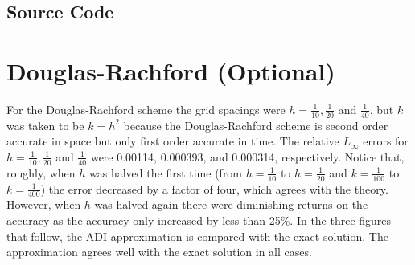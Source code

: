 \documentclass[a4paper,10pt]{article}
\begin{document}
	\subsection{Source Code}
	
	
	
	\section{Douglas-Rachford (Optional)}
	
	For the Douglas-Rachford scheme the grid spacings were $h = \frac{1}{10}, \frac{1}{20}$ and $\frac{1}{40}$, but $k$ was taken to be $k = h^2$ because the Douglas-Rachford scheme is second order accurate in space but only first order accurate in time.
	The relative $L_\infty$ errors for $h = \frac{1}{10}, \frac{1}{20}$ and $\frac{1}{40}$ were 0.00114, 0.000393, and 0.000314, respectively.
	Notice that, roughly, when $h$ was halved the first time (from $h = \frac{1}{10}$ to $h = \frac{1}{20}$ and $k = \frac{1}{100}$ to $k = \frac{1}{400}$) the error decreased by a factor of four, which agrees with the theory.
	However, when $h$ was halved again there were diminishing returns on the accuracy as the accuracy only increased by less than 25\%.
	In the three figures that follow, the ADI approximation is compared with the exact solution.
	The approximation agrees well with the exact solution in all cases.
	
\end{document}
